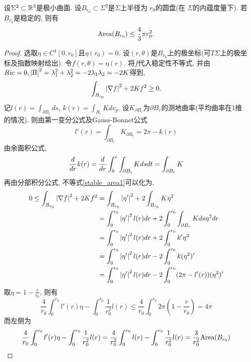 \begin{proposition} \label{mc_area}
    设$\Sigma^2 \subset \mathbb{R}^3$是极小曲面. 设$B_{r_0} \subset \Sigma^2$是$\Sigma$上半径为 $r_0$的圆盘(在 $\Sigma$的内蕴度量下). 若$B_{r_0}$是稳定的, 则有
    \begin{equation}
        \text{Area}(B_{r_0}) \le \frac{4}{3}\pi r_0^2.
    \end{equation}
\end{proposition}
\begin{proof}
    选取$\eta \in C^1[0,r_0]$且$\eta(r_0)=0$. 设$(r,\theta)$是$B_{r_0}$上的极坐标(可$T\Sigma$上的极坐标及指数映射给出). 令$f(r,\theta)=\eta(r)$. 将$f$代入稳定性不等式, 并由$Ric=0, \left | {\Pi} \right |^2=\lambda_1^2+\lambda_2^2=-2\lambda_1\lambda_2=-2K$得到,
    \begin{equation} \label{stable_area1}
        \int_{B_{r_0}} \left | \nabla f \right |^2 + 2Kf^2 \ge 0.
    \end{equation}
    记$l(r)=\int_{\partial B_r}ds$, $k(r)=\int_{B_r}Kdv_g$. 设$K_{\partial B_r}$为$\partial B_r$的测地曲率(平均曲率在1维的情况). 则由第一变分公式及Gauss-Bonnet公式
    \begin{equation}
        l'(r)=\int_{\partial B_r}K_{\partial B_r}=2\pi-k(r)
    \end{equation}
    由余面积公式,
    \begin{equation}
        \frac{d}{dr} k(r)=\frac{d}{dr} \int^r_0\int_{\partial B_t}Kdsdt = \int_{\partial B_r}K
    \end{equation}
    再由分部积分公式, 不等式\eqref{stable_area1}可以化为,
    \begin{equation}
        \begin{split}
            0 \le  \int_{B_{r_0}} \left | \nabla f \right |^2 + 2Kf^2 &= \int_{B_{r_0}}\left | \eta' \right |^2+2\int_{B_{r_0}}K\eta^2 \\
            &= \int^{r_0}_0 \left | \eta' \right |^2 l(r)dr+2\int^{r_0}_0\int_{\partial B_r} K ds \eta^2 dr\\
            &= \int^{r_0}_0 \left | \eta' \right |^2 l(r)dr+2\int^{r_0}_0k'\eta^2 \\
            &= \int^{r_0}_0 \left | \eta' \right |^2 l(r)dr-2\int^{r_0}_0k(\eta^2 )' \\
            &= \int^{r_0}_0 \left | \eta' \right |^2 l(r)dr-2\int^{r_0}_0(2\pi- l'(r))(\eta^2 )'
        \end{split}
    \end{equation}
    取$\eta=1-\frac{r}{r_0}$, 则有
    \begin{equation}
        \frac{4}{r_0}\int_0^{r_0}l'(r)\eta- \int^{r_0}_0\frac{1}{r_0^2}l(r) \le \frac{4}{r_0}\int_0^{r_0}2\pi (1-\frac{r}{r_0})=4\pi
    \end{equation}
    而左侧为
    \begin{equation}
        \frac{4}{r_0}\int_0^{r_0}l'(r)\eta- \int^{r_0}_0\frac{1}{r_0^2}l(r) =\frac{4}{r_0^2}\int^{r_0}_0l(r)- \int^{r_0}_0\frac{1}{r_0^2}l(r) =\frac{3}{r_0^2}\text{Area}(B_{r_0})
    \end{equation}
\end{proof}
